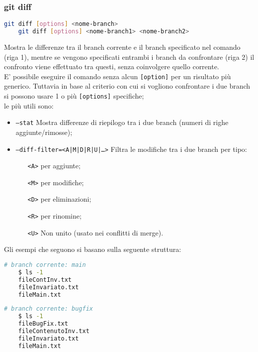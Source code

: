 \subsubsection{git diff}
\begin{lstlisting}[language=bash]
	git diff [options] <nome-branch>
	git diff [options] <nome-branch1> <nome-branch2>
\end{lstlisting}
Mostra le differenze tra il branch corrente e il branch specificato nel comando (riga 1), mentre se vengono specificati entrambi i branch da confrontare (riga 2) il confronto viene effettuato tra questi, senza coinvolgere quello corrente.\\
E' possibile eseguire il comando senza alcun \texttt{[option]} per un risultato più generico. Tuttavia in base al criterio con cui si vogliono confrontare i due branch si possono usare 1 o più \texttt{[options]} specifiche;\\
le più utili sono:
\begin{itemize}[noitemsep, topsep=3pt]
	\item \texttt{---stat} Mostra differenze di riepilogo tra i due branch (numeri di righe aggiunte/rimosse);
	\item \texttt{---diff-filter=<A|M|D|R|U|\dots>} Filtra le modifiche tra i due branch per tipo:
	\begin{itemize}[noitemsep, topsep=0pt]
		\item[\texttt{<A>}] per aggiunte;
		\item[\texttt{<M>}] per modifiche;
		\item[\texttt{<D>}] per eliminazioni;
		\item[\texttt{<R>}] per rinomine;
		\item[\texttt{<U>}] Non unito (usato nei conflitti di merge).
	\end{itemize}
\end{itemize}\vspace{.5cm}
Gli esempi che seguono si basano sulla seguente struttura:\vspace{.3cm}\\
\begin{minipage}{.45\textwidth}
\begin{lstlisting}[language=bash]
	# branch corrente: main
	$ ls -1
	fileContInv.txt
	fileInvariato.txt
	fileMain.txt
\end{lstlisting}
\end{minipage}
\hfill
\begin{minipage}{.45\textwidth}
\begin{lstlisting}[language=bash]
	# branch corrente: bugfix
	$ ls -1
	fileBugFix.txt
	fileContenutoInv.txt
	fileInvariato.txt
	fileMain.txt
\end{lstlisting}	
\end{minipage}
